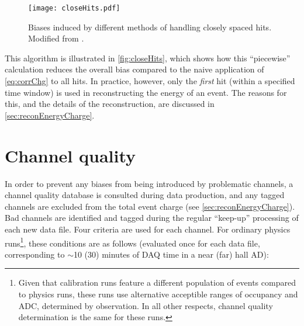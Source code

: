 \documentclass[../thesis.tex]{subfiles}
\begin{document}
\begin{figure}[ht]
  \texttt{[image: closeHits.pdf]}
  \caption{Biases induced by different methods of handling closely spaced hits. Modified from \cite{closeHits}.}
  \label{fig:closeHits}
\end{figure}

This algorithm is illustrated in \autoref{fig:closeHits}, which shows how this ``piecewise'' calculation reduces the overall bias compared to the naive application of \eqref{eq:corrChg} to all hits. In practice, however, only the \emph{first} hit (within a specified time window) is used in reconstructing the energy of an event. The reasons for this, and the details of the reconstruction, are discussed in \autoref{sec:reconEnergyCharge}.



\section{Channel quality}
\label{sec:calibCQ}

In order to prevent any biases from being introduced by problematic channels, a channel quality database is consulted during data production, and any tagged channels are excluded from the total event charge (see \autoref{sec:reconEnergyCharge}). Bad channels are identified and tagged during the regular ``keep-up'' processing of each new data file. Four criteria are used for each channel. For ordinary physics runs\footnote{Given that calibration runs feature a different population of events compared to physics runs, these runs use alternative acceptible ranges of occupancy and ADC, determined by observation. In all other respects, channel quality determination is the same for these runs.}, these conditions are as follows (evaluated once for each data file, corresponding to $\sim$10 (30) minutes of DAQ time in a near (far) hall AD):
\end{document}
